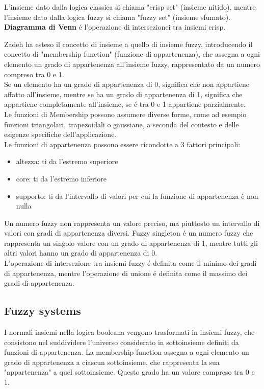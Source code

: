 L'insieme dato dalla logica classica si chiama "crisp set" (insieme nitido), mentre l'insieme dato dalla logica fuzzy 
si chiama "fuzzy set" (insieme sfumato).\\

\textbf{Diagramma di Venn} é l'operazione di intersezionei tra insiemi crisp.

Zadeh ha esteso il concetto di insieme a quello di insieme fuzzy, introducendo il concetto di "membership function" 
(funzione di appartenenza), che assegna a ogni elemento un grado di appartenenza all'insieme fuzzy, rappresentato 
da un numero compreso tra 0 e 1.\\
Se un elemento ha un grado di appartenenza di 0, significa che non appartiene affatto all'insieme,
mentre se ha un grado di appartenenza di 1, significa che appartiene completamente all'insieme, 
se é tra 0 e 1 appartiene parzialmente.\\

Le funzioni di Membership possono assumere diverse forme, come ad esempio funzioni triangolari, 
trapezoidali o gaussiane, a seconda del contesto e delle esigenze specifiche dell'applicazione.\\

Le funzioni di appartenenza possono essere ricondotte a 3 fattori principali:
\begin{itemize}
    \item altezza: ti da l'estremo superiore 
    \item core: ti da l'estremo inferiore 
    \item supporto: ti da l'intervallo di valori per cui la funzione di appartenenza è non nulla
\end{itemize}

Un numero fuzzy non rappresenta un valore preciso, ma piuttosto un intervallo di valori con gradi di appartenenza diversi.
Fuzzy singleton é un numero fuzzy che rappresenta un singolo valore con un grado di appartenenza di 1, 
mentre tutti gli altri valori hanno un grado di appartenenza di 0.\\

L'operazione di intersezione tra insiemi fuzzy é definita come il minimo dei gradi di appartenenza,
mentre l'operazione di unione é definita come il massimo dei gradi di appartenenza.\\

\subsection{Fuzzy systems}
I normali insiemi nella logica booleana vengono trasformati in insiemi fuzzy, che consistono nel suddividere
l'universo considerato in sottoinsieme definiti da funzioni di appartenenza.
La membership function assegna a ogni elemento un grado di appartenenza a ciascun sottoinsieme, 
che rappresenta la sua "appartenenza" a quel sottoinsieme.
Questo grado ha un valore compreso tra 0 e 1.\\

